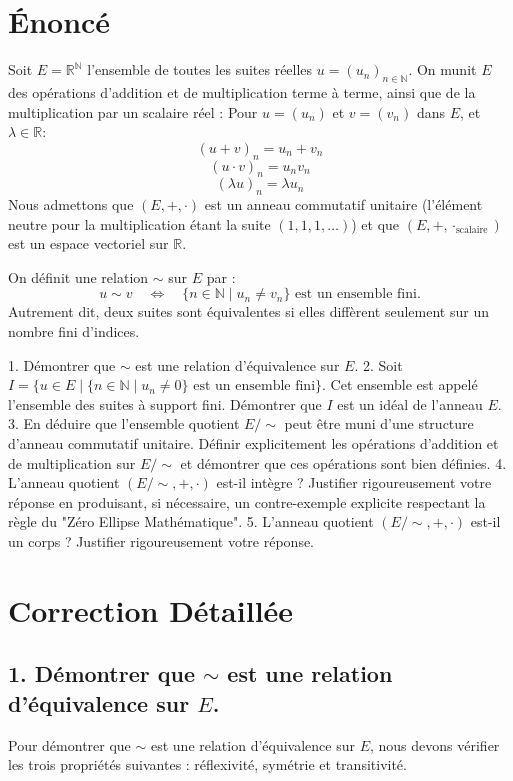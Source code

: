 \documentclass{report}
\begin{document}
\section*{Énoncé}
Soit $E = \mathbb{R}^{\mathbb{N}}$ l'ensemble de toutes les suites réelles $u = (u_n)_{n \in \mathbb{N}}$. On munit $E$ des opérations d'addition et de multiplication terme à terme, ainsi que de la multiplication par un scalaire réel :
Pour $u = (u_n)$ et $v = (v_n)$ dans $E$, et $\lambda \in \mathbb{R}$:
$$ (u+v)_n = u_n + v_n $$
$$ (u \cdot v)_n = u_n v_n $$
$$ (\lambda u)_n = \lambda u_n $$
Nous admettons que $(E, +, \cdot)$ est un anneau commutatif unitaire (l'élément neutre pour la multiplication étant la suite $(1, 1, 1, \dots)$) et que $(E, +, \cdot_{\text{scalaire}})$ est un espace vectoriel sur $\mathbb{R}$.

On définit une relation $\sim$ sur $E$ par :
$$ u \sim v \quad \iff \quad \{ n \in \mathbb{N} \mid u_n \neq v_n \} \text{ est un ensemble fini.} $$
Autrement dit, deux suites sont équivalentes si elles diffèrent seulement sur un nombre fini d'indices.

1.  Démontrer que $\sim$ est une relation d'équivalence sur $E$.
2.  Soit $I = \{ u \in E \mid \{ n \in \mathbb{N} \mid u_n \neq 0 \} \text{ est un ensemble fini} \}$. Cet ensemble est appelé l'ensemble des suites à support fini.
    Démontrer que $I$ est un idéal de l'anneau $E$.
3.  En déduire que l'ensemble quotient $E/\sim$ peut être muni d'une structure d'anneau commutatif unitaire. Définir explicitement les opérations d'addition et de multiplication sur $E/\sim$ et démontrer que ces opérations sont bien définies.
4.  L'anneau quotient $(E/\sim, +, \cdot)$ est-il intègre ? Justifier rigoureusement votre réponse en produisant, si nécessaire, un contre-exemple explicite respectant la règle du "Zéro Ellipse Mathématique".
5.  L'anneau quotient $(E/\sim, +, \cdot)$ est-il un corps ? Justifier rigoureusement votre réponse.

\section*{Correction Détaillée}

\subsection*{1. Démontrer que $\sim$ est une relation d'équivalence sur $E$.}

Pour démontrer que $\sim$ est une relation d'équivalence sur $E$, nous devons vérifier les trois propriétés suivantes : réflexivité, symétrie et transitivité.
\end{document}
